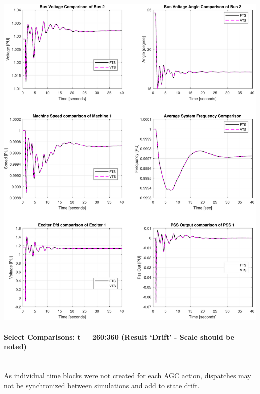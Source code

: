 \documentclass[12pt]{article}
\begin{document}
\includegraphics[width=\linewidth]{MWdetailComp1}


\pagebreak
\paragraph{Select Comparisons: t = 260:360 (Result `Drift' - Scale should be noted)} \ \\
As individual time blocks were not created for each AGC action, dispatches may not be synchronized between simulations and add to state drift. \\
\end{document}

